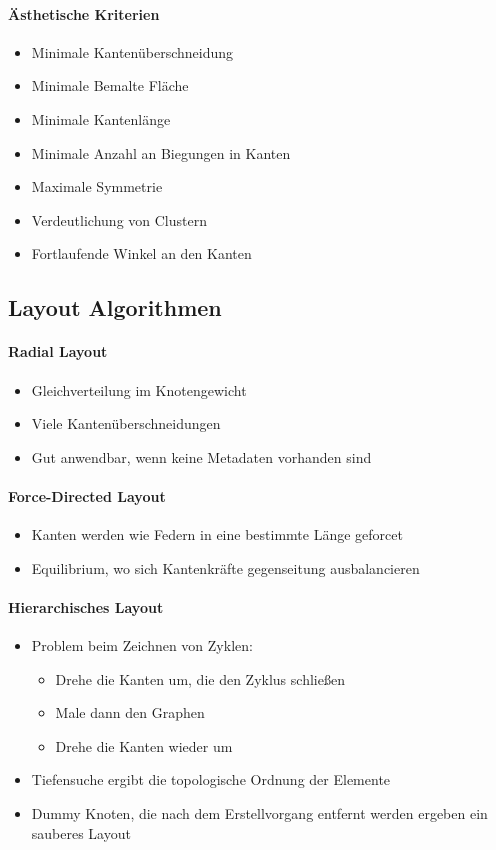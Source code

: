 \documentclass[ngerman]{scrartcl}
\begin{document}
\paragraph{Ästhetische Kriterien}
\begin{itemize}
  \item Minimale Kantenüberschneidung
  \item Minimale Bemalte Fläche
  \item Minimale Kantenlänge
  \item Minimale Anzahl an Biegungen in Kanten
  \item Maximale Symmetrie
  \item Verdeutlichung von Clustern
  \item Fortlaufende Winkel an den Kanten
\end{itemize}


\subsection{Layout Algorithmen}

\paragraph{Radial Layout}
\begin{itemize}
  \item Gleichverteilung im Knotengewicht
  \item Viele Kantenüberschneidungen
  \item Gut anwendbar, wenn keine Metadaten vorhanden sind
\end{itemize}

\paragraph{Force-Directed Layout}
\begin{itemize}
  \item Kanten werden wie Federn in eine bestimmte Länge geforcet
  \item Equilibrium, wo sich Kantenkräfte gegenseitung ausbalancieren
\end{itemize}

\paragraph{Hierarchisches Layout}
\begin{itemize}
  \item Problem beim Zeichnen von Zyklen:
  \begin{itemize}
    \item Drehe die Kanten um, die den Zyklus schließen
    \item Male dann den Graphen
    \item Drehe die Kanten wieder um
  \end{itemize}
  \item Tiefensuche ergibt die topologische Ordnung der Elemente
  \item Dummy Knoten, die nach dem Erstellvorgang entfernt werden ergeben ein sauberes Layout
\end{itemize}
\end{document}
